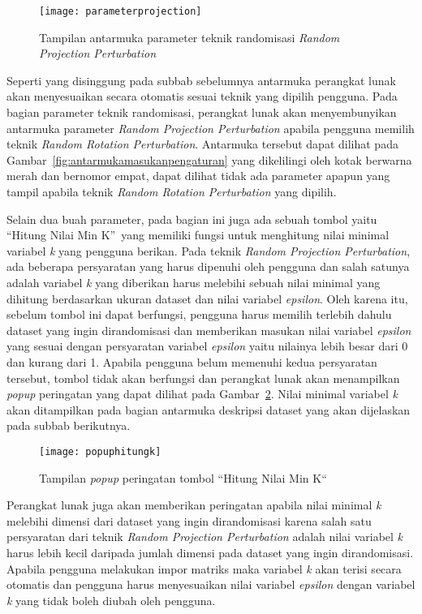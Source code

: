 \begin{figure}
	\centering
	\texttt{[image: parameterprojection]}
	\caption{Tampilan antarmuka parameter teknik randomisasi \textit{Random Projection Perturbation}}
	\label{fig:parameterprojection}
\end{figure}

Seperti yang disinggung pada subbab sebelumnya antarmuka perangkat lunak akan menyesuaikan secara otomatis sesuai teknik yang dipilih pengguna. Pada bagian parameter teknik randomisasi, perangkat lunak akan menyembunyikan antarmuka parameter \textit{Random Projection Perturbation} apabila pengguna memilih teknik \textit{Random Rotation Perturbation}. Antarmuka tersebut dapat dilihat pada Gambar~\ref{fig:antarmukamasukanpengaturan} yang dikelilingi oleh kotak berwarna merah dan bernomor empat, dapat dilihat tidak ada parameter apapun yang tampil apabila teknik \textit{Random Rotation Perturbation} yang dipilih.

Selain dua buah parameter, pada bagian ini juga ada sebuah tombol yaitu \textquotedblleft Hitung Nilai Min K\textquotedblright~yang memiliki fungsi untuk menghitung nilai minimal variabel \textit{k} yang pengguna berikan. Pada teknik \textit{Random Projection Perturbation}, ada beberapa persyaratan yang harus dipenuhi oleh pengguna dan salah satunya adalah variabel \textit{k} yang diberikan harus melebihi sebuah nilai minimal yang dihitung berdasarkan ukuran dataset dan nilai variabel \textit{epsilon}. Oleh karena itu, sebelum tombol ini dapat berfungsi, pengguna harus memilih terlebih dahulu dataset yang ingin dirandomisasi dan memberikan masukan nilai variabel \textit{epsilon} yang sesuai dengan persyaratan variabel \textit{epsilon} yaitu nilainya lebih besar dari 0 dan kurang dari 1. Apabila pengguna belum memenuhi kedua persyaratan tersebut, tombol tidak akan berfungsi dan perangkat lunak akan menampilkan \textit{popup} peringatan yang dapat dilihat pada Gambar~\ref{fig:popuphitungk}. Nilai minimal variabel \textit{k} akan ditampilkan pada bagian antarmuka deskripsi dataset yang akan dijelaskan pada subbab berikutnya.

\begin{figure}
	\centering
	\texttt{[image: popuphitungk]}
	\caption{Tampilan \textit{popup} peringatan tombol \textquotedblleft Hitung Nilai Min K\textquotedblleft }
	\label{fig:popuphitungk}
\end{figure}

Perangkat lunak juga akan memberikan peringatan apabila nilai minimal \textit{k} melebihi dimensi dari dataset yang ingin dirandomisasi karena salah satu persyaratan dari teknik \textit{Random Projection Perturbation} adalah nilai variabel \textit{k} harus lebih kecil daripada jumlah dimensi pada dataset yang ingin dirandomisasi. Apabila pengguna melakukan impor matriks maka variabel \textit{k} akan terisi secara otomatis dan pengguna harus menyesuaikan nilai variabel \textit{epsilon} dengan variabel \textit{k} yang tidak boleh diubah oleh pengguna. 

